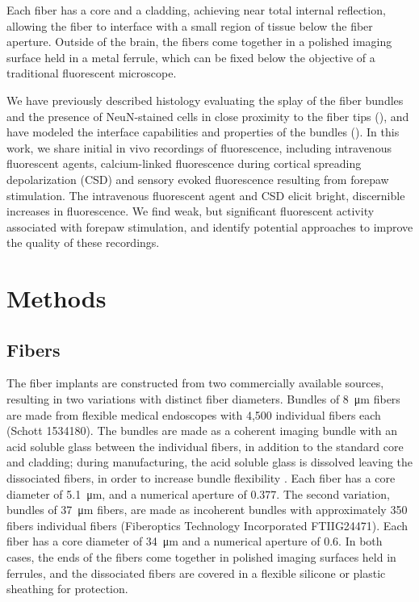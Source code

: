 Each fiber has a core and a cladding, achieving near total internal 
reflection, allowing the fiber to interface with a small region of 
tissue below the fiber aperture. Outside of the brain, the fibers come
 together in a polished imaging surface held in a metal ferrule, which
 can be fixed below the objective of a traditional fluorescent 
microscope.



We have previously described histology evaluating the splay of the 
fiber bundles and the presence of NeuN-stained cells in close 
proximity to the fiber tips (), and have modeled 
the interface capabilities and properties of the bundles (). 
In this work, we share initial in vivo recordings of fluorescence, 
including intravenous fluorescent agents, calcium-linked fluorescence 
during cortical spreading depolarization (CSD) and sensory evoked 
fluorescence resulting from forepaw stimulation. The intravenous 
fluorescent agent and CSD elicit bright, discernible increases in 
fluorescence. We find weak, but significant fluorescent activity 
associated with forepaw stimulation, and identify potential approaches
 to improve the quality of these recordings.

\section{Methods}

\subsection{Fibers}

The fiber implants are constructed from two commercially available 
sources, resulting in two variations with distinct fiber diameters. 
Bundles of 8~\si{\micro\meter} fibers are made from flexible medical 
endoscopes with 4,500 individual fibers each (Schott 1534180). The 
bundles are made as a coherent imaging bundle with an acid soluble 
glass between the individual fibers, in addition to the standard core 
and cladding; during manufacturing, the acid soluble glass is 
dissolved leaving the dissociated fibers, in order to increase bundle 
flexibility \cite{Gerstner:2004to}. Each fiber has a core diameter of 
5.1~\si{\micro\meter}, and a numerical aperture of 0.377. The second 
variation, bundles of 37~\si{\micro\meter} fibers, are made as 
incoherent bundles with approximately 350 fibers individual fibers 
(Fiberoptics Technology Incorporated FTIIG24471). Each fiber has a 
core diameter of 34~\si{\micro\meter} and a numerical aperture of 0.6.
 In both cases, the ends of the fibers come together in polished 
imaging surfaces held in ferrules, and the dissociated fibers are 
covered in a flexible silicone or plastic sheathing for protection.



